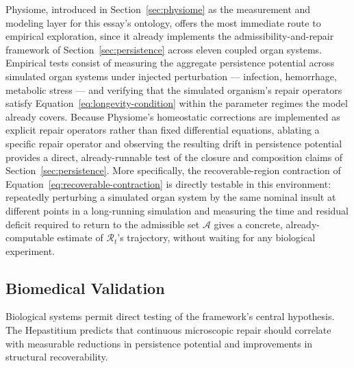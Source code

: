 \documentclass[12pt]{article}
\begin{document}
Physiome, introduced in Section~\ref{sec:physiome} as the measurement and modeling layer for this essay's ontology, offers the most immediate route to empirical exploration, since it already implements the admissibility-and-repair framework of Section~\ref{sec:persistence} across eleven coupled organ systems. Empirical tests consist of measuring the aggregate persistence potential across simulated organ systems under injected perturbation --- infection, hemorrhage, metabolic stress --- and verifying that the simulated organism's repair operators satisfy Equation~\eqref{eq:longevity-condition} within the parameter regimes the model already covers. Because Physiome's homeostatic corrections are implemented as explicit repair operators rather than fixed differential equations, ablating a specific repair operator and observing the resulting drift in persistence potential provides a direct, already-runnable test of the closure and composition claims of Section~\ref{sec:persistence}. More specifically, the recoverable-region contraction of Equation~\eqref{eq:recoverable-contraction} is directly testable in this environment: repeatedly perturbing a simulated organ system by the same nominal insult at different points in a long-running simulation and measuring the time and residual deficit required to return to the admissible set $\mathcal{A}$ gives a concrete, already-computable estimate of $\mathcal{R}_t$'s trajectory, without waiting for any biological experiment.

\subsection{Biomedical Validation}

Biological systems permit direct testing of the framework's central hypothesis. The Hepastitium predicts that continuous microscopic repair should correlate with measurable reductions in persistence potential and improvements in structural recoverability.
\end{document}
